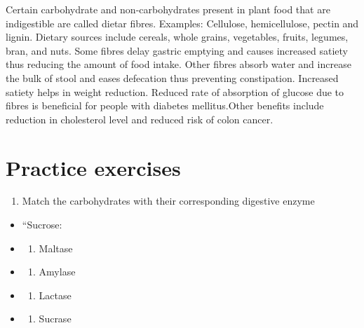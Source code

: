 \documentclass[
]{book}
\providecommand{\tightlist}{%
  \setlength{\itemsep}{0pt}\setlength{\parskip}{0pt}}
\begin{document}
Certain carbohydrate and non-carbohydrates present in plant food that are indigestible are called dietar fibres. Examples: Cellulose, hemicellulose, pectin and lignin. Dietary sources include cereals, whole grains, vegetables, fruits, legumes, bran, and nuts. Some fibres delay gastric emptying and causes increased satiety thus reducing the amount of food intake. Other fibres absorb water and increase the bulk of stool and eases defecation thus preventing constipation. Increased satiety helps in weight reduction. Reduced rate of absorption of glucose due to fibres is beneficial for people with diabetes mellitus.Other benefits include reduction in cholesterol level and reduced risk of colon cancer.

\section{Practice exercises}\label{practice-exercises}

\begin{enumerate}
\def\labelenumi{\arabic{enumi}.}
\tightlist
\item
  Match the carbohydrates with their corresponding digestive enzyme
\end{enumerate}

\begin{itemize}
\item
  ``Sucrose:
\item
  \begin{enumerate}
  \def\labelenumi{(\Alph{enumi})}
  \tightlist
  \item
    Maltase\\
  \end{enumerate}
\item
  \begin{enumerate}
  \def\labelenumi{(\Alph{enumi})}
  \setcounter{enumi}{1}
  \tightlist
  \item
    Amylase\\
  \end{enumerate}
\item
  \begin{enumerate}
  \def\labelenumi{(\Alph{enumi})}
  \setcounter{enumi}{2}
  \tightlist
  \item
    Lactase\\
  \end{enumerate}
\item
  \begin{enumerate}
  \def\labelenumi{(\Alph{enumi})}
  \setcounter{enumi}{3}
  \tightlist
  \item
    Sucrase
  \end{enumerate}
\end{itemize}
\end{document}
